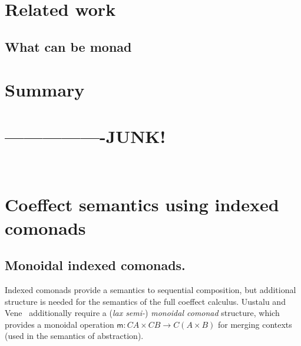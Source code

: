 
\section{Related work}

\subsection{What can be monad}
\label{sec:flat-related-monads}


\section{Summary}

\section{----------------JUNK!}





~
\newpage
~


\section{Coeffect semantics using indexed comonads}
\label{sec:comonads}


\vspace{-1em}
\subsection{Monoidal indexed comonads.}
Indexed comonads provide a semantics to sequential composition, but
additional structure is needed for the semantics of the full coeffect calculus.
Uustalu and Vene~\cite{comonads-notions} additionally require a (\emph{lax semi-}) \emph{monoidal comonad} 
structure, which provides a monoidal operation $\mathsf{m} : C A
\times C B \rightarrow C (A \times B)$ for merging contexts (used in
the semantics of abstraction).

